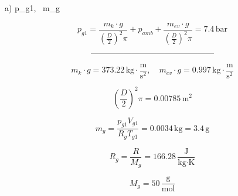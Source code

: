 a) \quad {} p_{g1}, \, m_g

\[
p_{g1} = \frac{m_k \cdot g}{\left(\frac{D}{2}\right)^2 \pi} + p_{amb} + \frac{m_{ev} \cdot g}{\left(\frac{D}{2}\right)^2 \pi} = 7.4 \, \text{bar}
\]

\[
\text{---------------------------------------------}
\]

\[
m_k \cdot g = 373.22 \, \text{kg} \cdot \frac{\text{m}}{\text{s}^2}, \quad m_{ev} \cdot g = 0.997 \, \text{kg} \cdot \frac{\text{m}}{\text{s}^2}
\]

\[
\left(\frac{D}{2}\right)^2 \pi = 0.00785 \, \text{m}^2
\]

\[
m_g = \frac{p_{g1} V_{g1}}{R_g T_{g1}} = 0.0034 \, \text{kg} = 3.4 \, \text{g}
\]

\[
R_g = \frac{R}{M_g} = 166.28 \, \frac{\text{J}}{\text{kg} \cdot \text{K}}
\]

\[
M_g = 50 \, \frac{\text{g}}{\text{mol}}
\]